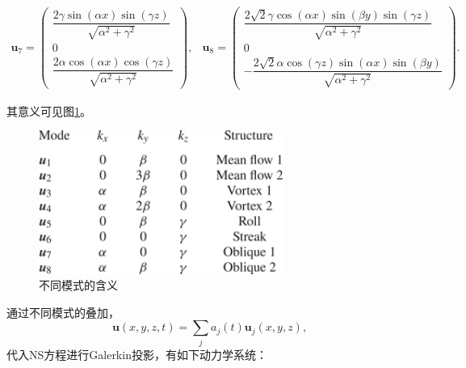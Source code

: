 \documentclass[UTF8,zihao=5]{ctexart} %
\begin{document}
\begin{subequations}
    \begin{gather}\boldsymbol{u}_7 = \left(\begin{array}{c} \dfrac{2 \gamma \sin(\alpha x) \sin(\gamma z)}{\sqrt{\alpha ^2+\gamma ^2}}\\ 0\\ \dfrac{2 \alpha \cos(\alpha x) \cos(\gamma z)}{\sqrt{\alpha ^2+\gamma ^2}} \end{array}\right), \end{gather}
    \begin{gather}\boldsymbol{u}_8 = \left(\begin{array}{c} \dfrac{2 \sqrt{2} \gamma \cos(\alpha x) \sin(\beta y) \sin(\gamma z)}{\sqrt{\alpha ^2+\gamma ^2}}\\ 0\\ -\dfrac{2 \sqrt{2} \alpha \cos(\gamma z) \sin(\alpha x) \sin(\beta y)}{\sqrt{\alpha ^2+\gamma ^2}} \end{array}\right). \end{gather}
\end{subequations}

其意义可见图\ref{fig:modes}。

\begin{figure}[H]
    \centering
    \includegraphics[width=8cm]{modes.png}  %
    \caption{不同模式的含义}
    \label{fig:modes}
\end{figure}

通过不同模式的叠加，
\begin{equation} \boldsymbol{u}(x,y,z,t) = \sum_j {a_j(t) \boldsymbol{u}_j(x,y,z)},\end{equation}
代入NS方程进行Galerkin投影，有如下动力学系统：
\end{document}
